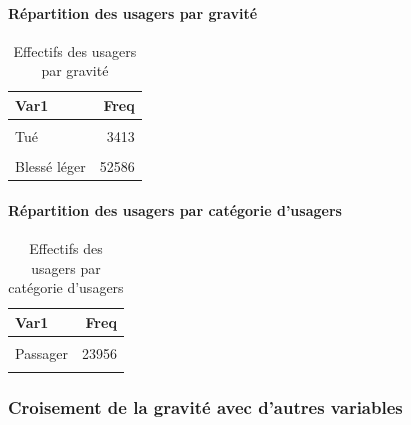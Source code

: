 \documentclass[french,]{tp}
\let\oldparagraph\paragraph
\renewcommand{\paragraph}[1]{\oldparagraph{#1}\mbox{}}
\begin{document}
\hypertarget{ruxe9partition-des-usagers-par-gravituxe9}{%
\paragraph{Répartition des usagers par gravité}\label{ruxe9partition-des-usagers-par-gravituxe9}}



\begin{table}[H]

\caption{\label{tab:tablegrav}Effectifs des usagers par gravité}
\centering
\begin{tabular}[t]{lr}
\toprule
\textbf{Var1} & \textbf{Freq}\\
\midrule
\cellcolor{gray!6}{Indemne} & \cellcolor{gray!6}{54529}\\
Tué & 3413\\
\cellcolor{gray!6}{Blessé hospitalisé} & \cellcolor{gray!6}{20329}\\
Blessé léger & 52586\\
\bottomrule
\end{tabular}
\end{table}

\hypertarget{ruxe9partition-des-usagers-par-catuxe9gorie-dusagers}{%
\paragraph{Répartition des usagers par catégorie d'usagers}\label{ruxe9partition-des-usagers-par-catuxe9gorie-dusagers}}



\begin{table}[H]

\caption{\label{tab:tablecatu}Effectifs des usagers par catégorie d'usagers}
\centering
\begin{tabular}[t]{lr}
\toprule
\textbf{Var1} & \textbf{Freq}\\
\midrule
\cellcolor{gray!6}{Conducteur} & \cellcolor{gray!6}{95854}\\
Passager & 23956\\
\cellcolor{gray!6}{Piéton} & \cellcolor{gray!6}{11047}\\
\bottomrule
\end{tabular}
\end{table}

\newpage

\hypertarget{croisement-de-la-gravituxe9-avec-dautres-variables}{%
\subsubsection{Croisement de la gravité avec d'autres variables}\label{croisement-de-la-gravituxe9-avec-dautres-variables}}
\end{document}

